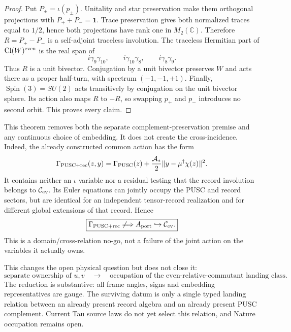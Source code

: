 \documentclass[11pt,a4paper]{article}
\theoremstyle{remark}
\newcommand{\id}{\mathbf 1}
\begin{document}
\begin{proof}
Put $P_\pm=\iota(p_\pm)$.  Unitality and star preservation make them
orthogonal projections with $P_++P_-=\id$.  Trace preservation gives both
normalized traces equal to $1/2$, hence both projections have rank one in
$M_2(\mathbb C)$.  Therefore $R=P_+-P_-$ is a self-adjoint traceless
involution.  The traceless Hermitian part of
$\operatorname{Cl}(W)^{\rm even}$ is the real span of
\begin{equation}
 i\gamma_9\gamma_{10},\qquad
 i\gamma_{10}\gamma_8,\qquad
 i\gamma_8\gamma_9.
\end{equation}
Thus $R$ is a unit bivector.  Conjugation by a unit bivector preserves $W$
and acts there as a proper half-turn, with spectrum $(-1,-1,+1)$.  Finally,
$\operatorname{Spin}(3)=SU(2)$ acts transitively by conjugation on the unit
bivector sphere.  Its action also maps $R$ to $-R$, so swapping $p_+$ and
$p_-$ introduces no second orbit.  This proves every claim.
\end{proof}

This theorem removes both the separate complement-preservation premise and
any continuous choice of embedding.  It does not create the cross-incidence.
Indeed, the already constructed common action has the form
\begin{equation}
 \Gamma_{\rm PUSC+rec}(z,y)
 =\Gamma_{\rm PUSC}(z)
 +\frac{\mathcal A_*}{2}
  \lVert y-\mu^\dagger\chi(z)\rVert^2.
 \label{eq:puscrecaction}
\end{equation}
It contains neither an $\iota$ variable nor a residual testing that the
record involution belongs to $\mathcal C_{\rm ev}$.  Its Euler equations can
jointly occupy the PUSC and record sectors, but are identical for an
independent tensor-record realization and for different global extensions of
that record.  Hence
\begin{equation}
 \boxed{
 \Gamma_{\rm PUSC+rec}
 \not\Longrightarrow
 A_{\rm port}\hookrightarrow\mathcal C_{\rm ev}.}
 \label{eq:landingnogo}
\end{equation}
This is a domain/cross-relation no-go, not a failure of the joint action on
the variables it actually owns.

This changes the open physical question but does not close it:
\begin{equation}
 \boxed{
 \text{separate ownership of }u,v
 \quad\longrightarrow\quad
 \text{occupation of the even-relative-commutant landing class}.}
 \label{eq:blockerreduction}
\end{equation}
The reduction is substantive: all frame angles, signs and embedding
representatives are gauge.  The surviving datum is only a single typed
landing relation between an already present record algebra and an already
present PUSC complement.  Current Tau source laws do not yet select this
relation, and Nature occupation remains open.
\end{document}
